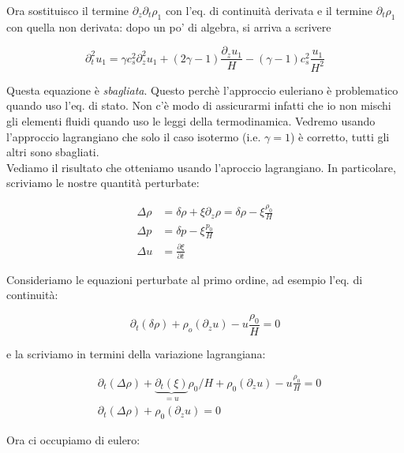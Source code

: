 \documentclass{report}
\begin{document}
Ora sostituisco il termine $\partial_z\partial_t\rho_1$ con l'eq. di continuità derivata e il termine $\partial_t\rho_1$ con quella non derivata: dopo un po' di algebra, si arriva a scrivere

\begin{equation}
    \partial^2_t u_1 = \gamma c_s^2 \partial^2_z u_1 + (2\gamma -1)\frac{\partial_z u_1}{H} - (\gamma -1)c_s^2 \frac{u_1}{H^2}
\end{equation}

Questa equazione è \emph{sbagliata}. Questo perchè l'approccio euleriano è problematico quando uso l'eq. di stato. Non c'è modo di assicurarmi infatti che io non mischi gli elementi fluidi quando uso le leggi della termodinamica. Vedremo usando l'approccio lagrangiano che solo il caso isotermo (i.e. $\gamma = 1$) è corretto, tutti gli altri sono sbagliati. \\

Vediamo il risultato che otteniamo usando l'aproccio lagrangiano. In particolare, scriviamo le nostre quantità perturbate: 

\begin{align}
    \Delta \rho &= \delta\rho + \xi\partial_z\rho = \delta\rho - \xi \frac{\rho_0}{H} \\
    \Delta p &= \delta p - \xi \frac{p_0}{H} \\
    \Delta u &= \frac{\partial \xi}{\partial t}
\end{align}

Consideriamo le equazioni perturbate al primo ordine, ad esempio l'eq. di continuità: 

\begin{equation}
    \partial_t(\delta \rho) + \rho_o (\partial_z u) - u\frac{\rho_0}{H} = 0 
\end{equation}

e la scriviamo in termini della variazione lagrangiana: 

\begin{align}
    &\partial_t(\Delta \rho) + \underbrace{\partial_t(\xi)}_{=u} \rho_0/H + \rho_0(\partial_z u) - u\frac{\rho_0}{H} = 0 \\
    &\partial_t(\Delta \rho) + \rho_0(\partial_zu) = 0 
\end{align}

Ora ci occupiamo di eulero: 
\end{document}
